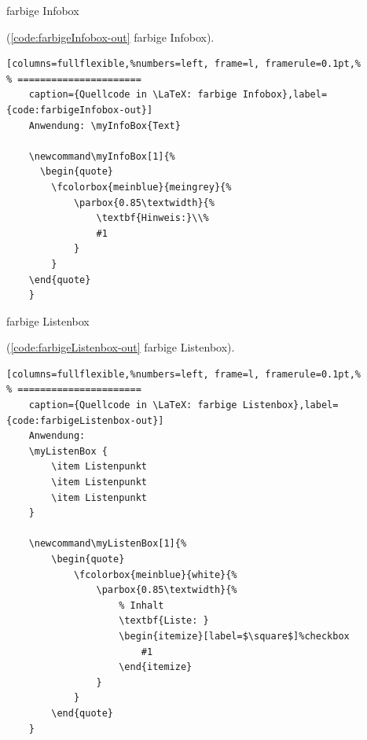 farbige Infobox

(\autoref{code:farbigeInfobox-out} farbige Infobox).
\lstset{language=[LaTeX]TeX} %
\begin{lstlisting}[columns=fullflexible,%numbers=left, frame=l, framerule=0.1pt,%
% ======================
	caption={Quellcode in \LaTeX: farbige Infobox},label={code:farbigeInfobox-out}]
	Anwendung: \myInfoBox{Text}

	\newcommand\myInfoBox[1]{%
	  \begin{quote}
		\fcolorbox{meinblue}{meingrey}{%
			\parbox{0.85\textwidth}{%
				\textbf{Hinweis:}\\%
				#1
			}
		}
	\end{quote}
	}
\end{lstlisting}

farbige Listenbox

(\autoref{code:farbigeListenbox-out} farbige Listenbox).
\lstset{language=[LaTeX]TeX} %
\begin{lstlisting}[columns=fullflexible,%numbers=left, frame=l, framerule=0.1pt,%
% ======================
	caption={Quellcode in \LaTeX: farbige Listenbox},label={code:farbigeListenbox-out}]
	Anwendung:
	\myListenBox {
		\item Listenpunkt
		\item Listenpunkt
		\item Listenpunkt
	}

	\newcommand\myListenBox[1]{%
		\begin{quote}
			\fcolorbox{meinblue}{white}{%
				\parbox{0.85\textwidth}{%
					% Inhalt
					\textbf{Liste: }
					\begin{itemize}[label=$\square$]%checkbox
						#1
					\end{itemize}
				}
			}
		\end{quote}
	}
\end{lstlisting}

